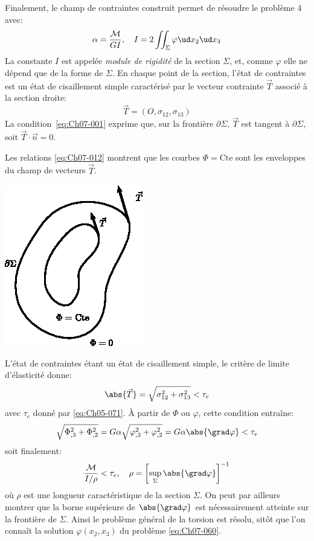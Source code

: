 Finalement, le champ de contraintes construit permet de résoudre le problème 4 avec:
\begin{equation}
    \alpha = \frac{\mathcal{M}}{GI},\quad I = 2 \iint_{\Sigma} \varphi \ud x_2 \ud x_3
    \label{eq:Ch07-064} 
\end{equation}
La constante $I$ est appelée \emph{module de rigidité} de la section $\Sigma$, et, comme $\varphi$ elle ne dépend que de la forme de $\Sigma$. En chaque point de la section, l'état de contraintes est un état de cisaillement simple caractérisé par le vecteur contrainte $\vec{T}$ associé à la section droite:
\begin{equation}
    \vec{T} = \left( O, \sigma_{12}, \sigma_{13} \right)
    \label{eq:Ch07-065} 
\end{equation}
La condition~\eqref{eq:Ch07-001} exprime que, sur la frontière $\partial \Sigma$, $\vec{T}$ est tangent à $\partial \Sigma$, soit $\vec{T} \cdot \vec{n} = 0$.
\begin{multicols}{2}
    Les relations \eqref{eq:Ch07-012} montrent que les courbes $\Phi = \text{Cte}$ sont les enveloppes du champ de vecteurs $\vec{T}$.
    \columnbreak
    \begin{center}
        \includegraphics{../images/T1_Ch07-15}
    \end{center}
\end{multicols}

L'état de contraintes étant un état de cisaillement simple, le critère de limite d'élasticité donne: 
\begin{equation}
    \abs{\vec{T}} = \sqrt{\sigma_{12}^2 + \sigma_{13}^2} < \tau_e    
    \label{eq:Ch07-067}
\end{equation}
avec $\tau_e$ donné par \eqref{eq:Ch05-071}.
À partir de $\Phi$ ou $\varphi$, cette condition entraîne: 
\[
    \sqrt{\Phi_{,3}^2 + \Phi_{,2}^2} = G \alpha \sqrt{\varphi_{,3}^2 + \varphi_{,2}^2} = G \alpha \abs{\grad \varphi} < \tau_e
\]
soit finalement:
\begin{equation}
    \frac{\mathcal{M}}{I/\rho} < \tau_e, \quad \rho = \left[ \sup_{\Sigma} \abs{\grad \varphi} \right]^{-1}
    \label{eq:Ch07-068}
\end{equation}
où $\rho$ est une longueur caractéristique de la section $\Sigma$.
On peut par ailleurs montrer que la borne supérieure de $\abs{\grad \varphi}$ est nécessairement atteinte sur la frontière de $\Sigma$.
Ainsi le problème général de la torsion est résolu, sitôt que l'on connaît la solution $\varphi\left( x_2,x_3 \right)$ du problème \eqref{eq:Ch07-060}. 

